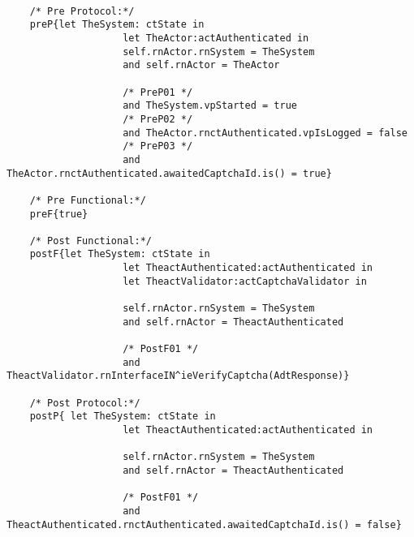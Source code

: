 	\scriptsize
	\vspace{0.5cm}
	\begin{lstlisting}[style=MessirStyle,firstnumber=auto,captionpos=b,caption={\msrmessir (MCL-oriented) specification of the operation \emph{oeSubmitCaptcha}.},label=OM-actAuthenticated-oeSubmitCaptcha-MCL-LST]

	/* Pre Protocol:*/ 
	preP{let TheSystem: ctState in
					let TheActor:actAuthenticated in
					self.rnActor.rnSystem = TheSystem
					and self.rnActor = TheActor
	  
					/* PreP01 */
					and TheSystem.vpStarted = true
					/* PreP02 */
					and TheActor.rnctAuthenticated.vpIsLogged = false
					/* PreP03 */
					and TheActor.rnctAuthenticated.awaitedCaptchaId.is() = true}
	
	/* Pre Functional:*/
	preF{true}
	
	/* Post Functional:*/ 
	postF{let TheSystem: ctState in
					let TheactAuthenticated:actAuthenticated in
					let TheactValidator:actCaptchaValidator in
	  
					self.rnActor.rnSystem = TheSystem
					and self.rnActor = TheactAuthenticated
					
					/* PostF01 */
					and TheactValidator.rnInterfaceIN^ieVerifyCaptcha(AdtResponse)}
	
	/* Post Protocol:*/ 
	postP{ let TheSystem: ctState in
					let TheactAuthenticated:actAuthenticated in
	  
					self.rnActor.rnSystem = TheSystem
					and self.rnActor = TheactAuthenticated
					
					/* PostF01 */
					and TheactAuthenticated.rnctAuthenticated.awaitedCaptchaId.is() = false}
	
	\end{lstlisting}
	\normalsize 
	
	
	
	





